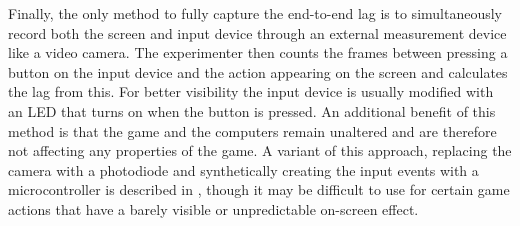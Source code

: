 

Finally, the only method to fully capture the end-to-end lag is to simultaneously record both the screen and input device through an external measurement device like a video camera.
The experimenter then counts the frames between pressing a button on the input device and the action appearing on the screen and calculates the lag from this. For better visibility the input device is usually modified with an LED that turns on when the button is pressed.
An additional benefit of this method is that the game and the computers remain unaltered and are therefore not affecting any properties of the game. A variant of this approach, replacing the camera with a photodiode and synthetically creating the input events with a microcontroller is described in \cite{beyermethod}, though it may be difficult to use for certain game actions that have a barely visible or unpredictable on-screen effect.





